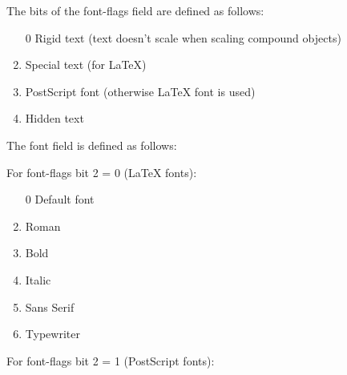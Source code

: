 \documentclass[10pt, a4paper]{article}
\begin{document}
The bits of the font-flags field are defined as follows:

\begin{enumerate}
\item[0]
Rigid text (text doesn't scale when scaling compound objects)
\item
Special text (for \LaTeX)
\item
PostScript font (otherwise \LaTeX{} font is used)
\item
Hidden text
\end{enumerate}

The font field is defined as follows:

For font-flags bit 2 = 0 (\LaTeX{} fonts):

\begin{enumerate}
\item[0] Default font
\item    Roman
\item    Bold
\item    Italic
\item    Sans Serif
\item    Typewriter
\end{enumerate}

For font-flags bit 2 = 1 (PostScript fonts):
\end{document}
